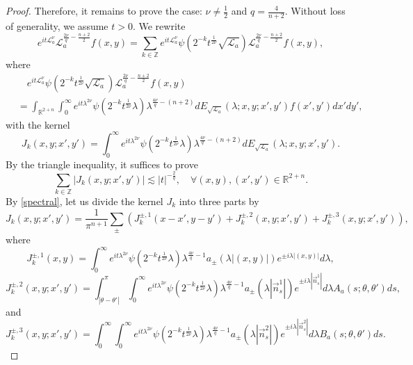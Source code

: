\documentclass[a4paper,11pt, reqno]{amsart}
\numberwithin{equation}{section}
\theoremstyle{plain}
\theoremstyle{definition}
\theoremstyle{remark}
\begin{document}
\begin{proof}
Therefore, it remains to prove the case: $\nu\not=\frac{1}{2}$ and $q=\frac{4}{n+2}$. Without loss of generality, we assume $t>0$.
We rewrite
\begin{equation*}
e^{it\mathcal{L}_a^\nu} \mathcal{L}_a^{\frac{2\nu}{q}-\frac{n+2}{2}}f(x,y)=\sum_{k\in\mathbb{Z}}e^{it\mathcal{L}_a^\nu} \psi(2^{-k}t^\frac{1}{2\nu}\sqrt{\mathcal{L}_a})\mathcal{L}_a^{\frac{2\nu}{q}-\frac{n+2}{2}}f(x,y),
\end{equation*}
where 
\begin{align*}
&\quad e^{it\mathcal{L}_a^\nu} \psi(2^{-k}t^\frac{1}{2\nu}\sqrt{\mathcal{L}_a})\mathcal{L}_a^{\frac{2\nu}{q}-\frac{n+2}{2}}f(x,y)\\
&=\int_{\mathbb{R}^{2+n}}\int_0^\infty e^{it\lambda^{2\nu}} \psi(2^{-k}t^\frac{1}{2\nu}\lambda)\lambda^{\frac{4\nu}{q}-(n+2)}dE_{\sqrt{\mathcal{L}_a}}(\lambda; x,y; x',y')f(x',y')dx'dy',
\end{align*}
with the kernel
\begin{equation*}
J_k(x,y;x',y')=\int_0^\infty e^{it\lambda^{2\nu}} \psi(2^{-k}t^\frac{1}{2\nu}\lambda)\lambda^{\frac{4\nu}{q}-(n+2)}dE_{\sqrt{\mathcal{L}_a}}(\lambda; x,y; x',y').
\end{equation*}
By the triangle inequality, it suffices to prove
\begin{equation}\label{key kernel}
\sum_{k\in\mathbb{Z}}|J_k(x,y;x',y')|\lesssim |t|^{-\frac{2}{q}}, \quad\forall (x,y),(x',y')\in\mathbb{R}^{2+n}.
\end{equation}
By \eqref{spectral}, let us divide the kernel $J_k$ into three parts by
\begin{equation*}
J_k(x,y;x',y')=\frac{1}{\pi^{n+1}}\sum_{\pm}\left(J_k^{\pm,1}(x-x',y-y')+J_k^{\pm,2}(x,y;x',y')+J_k^{\pm,3}(x,y;x',y')\right), 
\end{equation*}
where
\begin{equation*}
J_k^{\pm,1}(x,y)=\int_0^\infty  e^{it\lambda^{2\nu}} \psi(2^{-k}t^\frac{1}{2\nu}\lambda)\lambda^{\frac{4\nu}{q}-1}a_{\pm}(\lambda|(x,y)|)e^{\pm i\lambda|(x,y)|}d\lambda,
\end{equation*}
\begin{equation*}
J_k^{\pm,2}(x,y;x',y')=\int_{|\theta-\theta'|}^\pi \int_0^\infty   e^{it\lambda^{2\nu}} \psi(2^{-k}t^\frac{1}{2\nu}\lambda)\lambda^{\frac{4\nu}{q}-1}a_{\pm}(\lambda|\overset{\rightarrow}{n}_s^1|)e^{\pm i\lambda|\overset{\rightarrow}{n}_s^1|}d\lambda A_a(s;\theta,\theta')ds,
\end{equation*}
and
\begin{equation*}
J_k^{\pm,3}(x,y;x',y')=\int_0^\infty \int_0^\infty   e^{it\lambda^{2\nu}} \psi(2^{-k}t^\frac{1}{2\nu}\lambda)\lambda^{\frac{4\nu}{q}-1}a_{\pm}(\lambda|\overset{\rightarrow}{n}_s^2|)e^{\pm i\lambda|\overset{\rightarrow}{n}_s^2|}d\lambda B_a(s;\theta,\theta')ds.

\end{equation*}
\end{proof}
\end{document}
